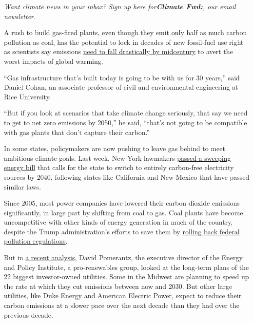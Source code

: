 \emph{Want climate news in your inbox?}
\href{https://www.nytimes3xbfgragh.onion/newsletters/climate-change}{\emph{Sign
up here
for}}\textbf{\href{https://www.nytimes3xbfgragh.onion/newsletters/climate-change}{\emph{Climate
Fwd:}}}\emph{, our email newsletter.}

A rush to build gas-fired plants, even though they emit only half as
much carbon pollution as coal, has the potential to lock in decades of
new fossil-fuel use right as scientists say emissions
\href{https://www.nytimes3xbfgragh.onion/interactive/2018/10/07/climate/ipcc-report-half-degree.html}{need
to fall drastically by midcentury} to avert the worst impacts of global
warming.

``Gas infrastructure that's built today is going to be with us for 30
years,'' said Daniel Cohan, an associate professor of civil and
environmental engineering at Rice University.

``But if you look at scenarios that take climate change seriously, that
say we need to get to net zero emissions by 2050,'' he said, ``that's
not going to be compatible with gas plants that don't capture their
carbon.''

In some states, policymakers are now pushing to leave gas behind to meet
ambitious climate goals. Last week, New York lawmakers
\href{https://www.nytimes3xbfgragh.onion/2019/06/18/nyregion/greenhouse-gases-ny.html}{passed
a sweeping energy bill} that calls for the state to switch to entirely
carbon-free electricity sources by 2040, following states like
California and New Mexico that have passed similar laws.

Since 2005, most power companies have lowered their carbon dioxide
emissions significantly, in large part by shifting from coal to gas.
Coal plants have become uncompetitive with other kinds of energy
generation in much of the country, despite the Trump administration's
efforts to save them by
\href{https://www.nytimes3xbfgragh.onion/2019/06/19/climate/epa-coal-emissions.html}{rolling
back federal pollution regulations}.

But in \href{http://www.energyandpolicy.org/utility-carbon-targets}{a
recent analysis}, David Pomerantz, the executive director of the Energy
and Policy Institute, a pro-renewables group, looked at the long-term
plans of the 22 biggest investor-owned utilities. Some in the Midwest
are planning to speed up the rate at which they cut emissions between
now and 2030. But other large utilities, like Duke Energy and American
Electric Power, expect to reduce their carbon emissions at a slower pace
over the next decade than they had over the previous decade.

